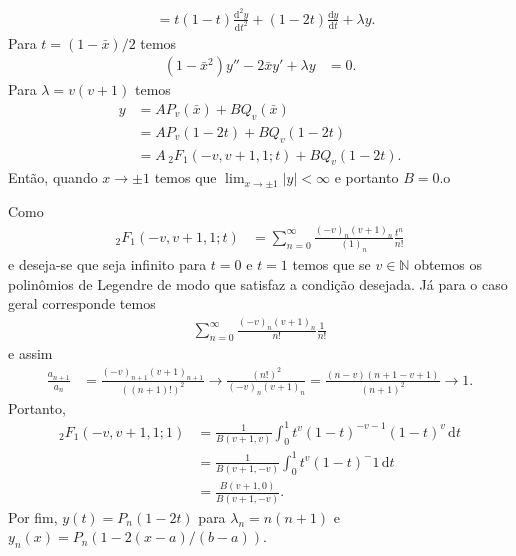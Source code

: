 \documentclass[a4paper,12pt, leqno, answers]{exam}
\begin{document}
\begin{questions}
\begin{parts}
\begin{solution}
\begin{align*}
                &= t \left( 1 - t \right) \frac{\mathrm{d}^2y}{\mathrm{d}t^2} + \left( 1 - 2 t \right) \frac{\mathrm{d}y}{\mathrm{d}t} + \lambda y.
            \end{align*}
            Para $t = \left( 1 - \bar{x} \right) / 2$ temos
            \begin{align*}
                \left( 1 - \bar{x}^2 \right) y'' - 2 \bar{x} y' + \lambda y &= 0.
            \end{align*}
            Para $\lambda = v \left( v + 1 \right)$ temos
            \begin{align*}
                y &= A P_v (\bar{x}) + B Q_v(\bar{x}) \\
                &= A P_v(1 - 2 t) + B Q_v(1 - 2 t) \\
                &= A \,_2F_1(-v, v + 1, 1; t) + B Q_v(1 - 2 t).
            \end{align*}
            Ent\~{a}o, quando $x \to \pm 1$ temos que $\lim_{x \to \pm 1} | y | < \infty$ e portanto $B = 0$.o

            Como 
            \begin{align*}
                _2F_1(-v, v + 1, 1; t) &= \sum_{n = 0}^\infty \frac{(-v)_n (v + 1)_n}{(1)_n} \frac{t^n}{n!}
            \end{align*}
            e deseja-se que seja infinito para $t = 0$ e $t = 1$ temos que se $v \in \mathbb{N}$ obtemos os polin\^{o}mios de Legendre de modo que satisfaz a condi\c{c}\~{a}o desejada. J\'{a} para o caso geral corresponde temos
            \begin{align*}
                \sum_{n = 0}^\infty \frac{(-v)_n (v + 1)_n}{n!} \frac{1}{n!}
            \end{align*}
            e assim
            \begin{align*}
                \frac{a_{n + 1}}{a_n} &= \frac{(-v)_{n + 1} (v + 1)_{n + 1}}{\left( (n + 1)! \right)^2} \to \frac{(n!)^2}{(-v)_n (v + 1)_n} = \frac{(n - v) (n + 1 - v + 1)}{(n + 1)^2} \to 1.
            \end{align*}
            Portanto,
            \begin{align*}
                _2F_1(-v, v + 1, 1; 1) &= \frac{1}{B(v + 1, v)} \int_0^1 t^v \left( 1 - t \right)^{-v - 1} \left( 1 - t \right)^v \,\mathrm{d}t \\
                &= \frac{1}{B(v + 1, - v)} \int_0^1 t^{v} (1 - t)^-1 \,\mathrm{d}t \\
                &= \frac{B(v + 1, 0)}{B(v + 1, - v)}.
            \end{align*}
            Por fim, $y(t) = P_n(1 - 2t)$ para $\lambda_n = n(n + 1)$ e $y_n(x) = P_n(1 - 2 (x - a)/(b - a))$.


\end{solution}
\end{parts}
\end{questions}
\end{document}
